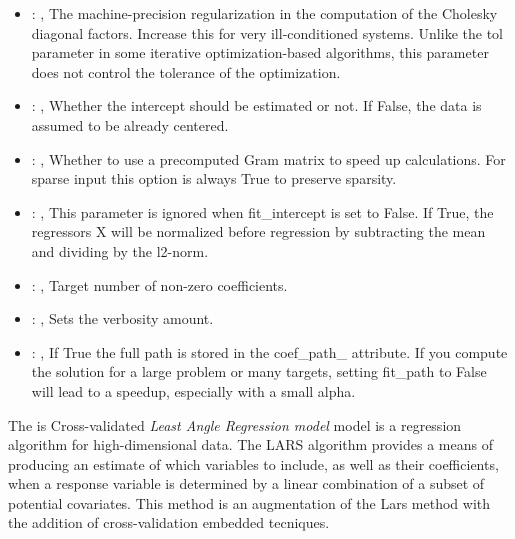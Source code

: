 \begin{itemize}
    \item {}: , 
      The machine-precision regularization in the computation of the Cholesky
      diagonal factors. Increase this for very ill-conditioned systems. Unlike the tol
      parameter in some iterative optimization-based algorithms, this parameter does not
      control the tolerance of the optimization.

    \item {}: , 
      Whether the intercept should be estimated or not. If False,
      the data is assumed to be already centered.

    \item {}: , 
      Whether to use a precomputed Gram matrix to speed up calculations.
      For sparse input this option is always True to preserve sparsity.

    \item {}: , 
      This parameter is ignored when fit\_intercept is set to False. If True,
      the regressors X will be normalized before regression by subtracting the mean and
      dividing by the l2-norm.

    \item {}: , 
      Target number of non-zero coefficients.

    \item {}: , 
      Sets the verbosity amount.

    \item {}: , 
      If True the full path is stored in the coef\_path\_ attribute.
      If you compute the solution for a large problem or many targets,
      setting fit\_path to False will lead to a speedup, especially with a
      small alpha.
  \end{itemize}
 The  is Cross-validated \textit{Least Angle Regression model} model
 is a regression algorithm for high-dimensional data.                         The LARS algorithm
 provides a means of producing an estimate of which variables                         to include, as
 well as their coefficients, when a response variable is                         determined by a
 linear combination of a subset of potential covariates.                         This method is an
 augmentation of the Lars method with the addition of cross-validation
 embedded tecniques.                         


